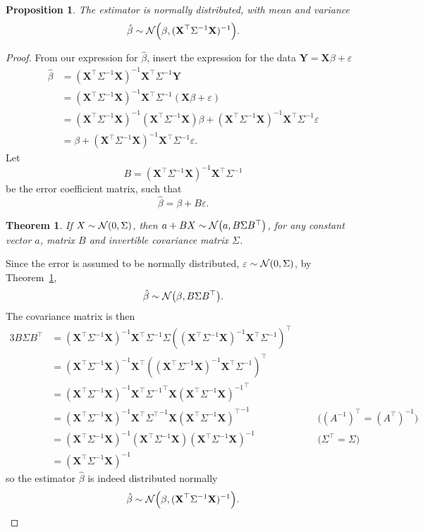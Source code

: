 \documentclass[letterpaper, reqno]{amsart}
\newtheorem{theorem}{Theorem}[section]
\newtheorem{prop}{Proposition}[section]
\numberwithin{equation}{section}
\newcommand{\T}{\top} %
\newcommand{\vect}[1]{\boldsymbol{\mathbf{#1}}} %
\newcommand{\N}[2]{\mathcal{N}\mleft( #1, #2 \mright)}
\newcommand{\by}[1]{&\quad&\text{(#1)}}
\newcommand{\Xm}{\vect{X}}
\newcommand{\Yv}{\vect{Y}}
\newcommand{\Bv}{\beta}
\newcommand{\Bvh}{\hat{\beta}}
\newcommand{\ve}{\varepsilon}
\begin{document}
\begin{prop} \label{prop:BvN}
  The estimator is normally distributed, with mean and variance
  \[ \Bvh \sim \N{\Bv}{(\Xm^\T \Sigma^{-1} \Xm)^{-1}}. \]
\end{prop}

\begin{proof}
  From our expression for $\Bvh$, insert the expression for the data $\Yv
  = \Xm\Bv + \ve$
  \begin{align*}
    \Bvh &= (\Xm^\T \Sigma^{-1} \Xm)^{-1} \Xm^\T \Sigma^{-1} \Yv \\
         &= (\Xm^\T \Sigma^{-1} \Xm)^{-1} \Xm^\T \Sigma^{-1} (\Xm\Bv + \ve) \\
         &= (\Xm^\T \Sigma^{-1} \Xm)^{-1} (\Xm^\T \Sigma^{-1} \Xm)\Bv 
          + (\Xm^\T \Sigma^{-1} \Xm)^{-1} \Xm^\T \Sigma^{-1} \ve \\
         &= \Bv + (\Xm^\T \Sigma^{-1} \Xm)^{-1} \Xm^\T \Sigma^{-1} \ve.
  \end{align*}
  Let
  \[ B = (\Xm^\T \Sigma^{-1} \Xm)^{-1} \Xm^\T \Sigma^{-1} \]
  be the error coefficient matrix, such that
  \[ \Bvh = \Bv + B\ve. \]

  \begin{theorem} \label{thm:Bx}
    If $X \sim \N{0}{\Sigma}$, then $a + BX \sim \N{a}{B \Sigma B^\T}$,
    for any constant vector $a$, matrix $B$ and invertible covariance matrix
    $\Sigma$.
  \end{theorem}

  Since the error is assumed to be normally distributed,
  $\ve \sim \N{0}{\Sigma}$, by Theorem~\ref{thm:Bx},
  \[ \Bvh \sim \N{\Bv}{B \Sigma B^\T}. \]
  The covariance matrix is then
  \begin{alignat*}{3}
    B \Sigma B^\T &= (\Xm^\T \Sigma^{-1} \Xm)^{-1} \Xm^\T \Sigma^{-1} \Sigma
                    ((\Xm^\T \Sigma^{-1} \Xm)^{-1} \Xm^\T \Sigma^{-1})^\T \\
                  &= (\Xm^\T \Sigma^{-1} \Xm)^{-1} \Xm^\T 
                    ((\Xm^\T \Sigma^{-1} \Xm)^{-1} \Xm^\T \Sigma^{-1})^\T \\
                  &= (\Xm^\T \Sigma^{-1} \Xm)^{-1} \Xm^\T 
                    {\Sigma^{-1}}^\T \Xm {(\Xm^\T \Sigma^{-1} \Xm)^{-1}}^\T \\
                  &= (\Xm^\T \Sigma^{-1} \Xm)^{-1} \Xm^\T 
                    {\Sigma^\T}^{-1} \Xm {(\Xm^\T \Sigma^{-1} \Xm)^\T}^{-1}
                    \by{${(A^{-1})}^\T = {(A^\T)}^{-1}$} \\
                  &= (\Xm^\T \Sigma^{-1} \Xm)^{-1} 
                     (\Xm^\T \Sigma^{-1} \Xm) (\Xm^\T \Sigma^{-1} \Xm)^{-1}
                    \by{$\Sigma^\T = \Sigma$} \\
                  &= (\Xm^\T \Sigma^{-1} \Xm)^{-1} 
  \end{alignat*}
  so the estimator $\Bvh$ is indeed distributed normally
  \[ \Bvh \sim \N{\Bv}{(\Xm^\T \Sigma^{-1} \Xm)^{-1}}. \qedhere \]
\end{proof}
\end{document}
